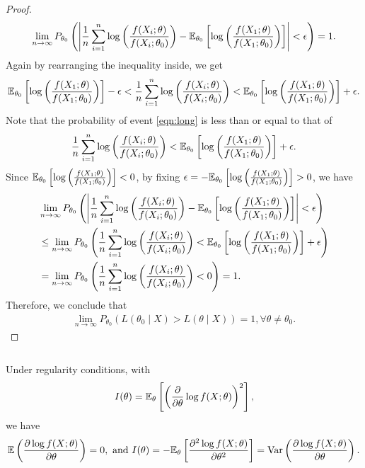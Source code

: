 \begin{proof}
\begin{align*}
\lim_{n\to\infty}P_{\theta_0}\left( \left| \frac{1}{n}\sum_{i=1}^n\log\left( \frac{f(X_i;\theta)}{f(X_i;\theta_0)} \right) - \mathbb{E}_{\theta_0}\left[ \log \left( \frac{f(X_1; \theta)}{f(X_1; \theta_0)} \right) \right] \right| < \epsilon \right) = 1.
\end{align*}
Again by rearranging the inequality inside, we get
\begin{align}
\mathbb{E}_{\theta_0}\left[ \log \left( \frac{f(X_1; \theta)}{f(X_1; \theta_0)} \right) \right] - \epsilon < \frac{1}{n}\sum_{i=1}^n\log\left( \frac{f(X_i;\theta)}{f(X_i;\theta_0)} \right) < \mathbb{E}_{\theta_0}\left[ \log \left( \frac{f(X_1; \theta)}{f(X_1; \theta_0)} \right) \right] + \epsilon. \label{eqn:long}
\end{align}
Note that the probability of event \cref{eqn:long} is less than or equal to that of
\begin{align*}
\frac{1}{n}\sum_{i=1}^n\log\left( \frac{f(X_i;\theta)}{f(X_i;\theta_0)} \right) < \mathbb{E}_{\theta_0}\left[ \log \left( \frac{f(X_1; \theta)}{f(X_1; \theta_0)} \right) \right] + \epsilon.
\end{align*}
Since $\mathbb{E}_{\theta_0}\left[ \log \left( \frac{f(X_1; \theta)}{f(X_1; \theta_0)} \right) \right] < 0$, by fixing $\epsilon = -\mathbb{E}_{\theta_0}\left[ \log \left( \frac{f(X_1; \theta)}{f(X_1; \theta_0)} \right) \right] > 0$, we have
\begin{align*}
&\lim_{n\to\infty}P_{\theta_0}\left( \left| \frac{1}{n}\sum_{i=1}^n\log\left( \frac{f(X_i;\theta)}{f(X_i;\theta_0)} \right) - \mathbb{E}_{\theta_0}\left[ \log \left( \frac{f(X_1; \theta)}{f(X_1; \theta_0)} \right) \right] \right| < \epsilon \right)\\
&\leq \lim_{n\to\infty}P_{\theta_0}\left( \frac{1}{n}\sum_{i=1}^n\log\left( \frac{f(X_i;\theta)}{f(X_i;\theta_0)} \right) < \mathbb{E}_{\theta_0}\left[ \log \left( \frac{f(X_1; \theta)}{f(X_1; \theta_0)} \right) \right] + \epsilon \right)\\
&= \lim_{n\to\infty}P_{\theta_0}\left( \frac{1}{n}\sum_{i=1}^n\log\left( \frac{f(X_i;\theta)}{f(X_i;\theta_0)} \right) < 0 \right) = 1.
\end{align*}
Therefore, we conclude that
\begin{align*}
\lim_{n\to\infty} P_{\theta_0}\left( L(\theta_0 \mid X) > L(\theta \mid X) \right) = 1, \forall \theta \neq \theta_0.
\end{align*}
\end{proof}
$ $\\
\begin{lemma} \label{lem:2}
Under regularity conditions, with
\begin{align}
I(\theta) = \mathbb{E}_{\theta}\left[ \left( \frac{\partial}{\partial\theta}\log f(X;\theta) \right)^2 \right], \label{eqn:fisher}
\end{align}
we have
\begin{align*}
\mathbb{E}\left( \frac{\partial\log f(X;\theta)}{\partial \theta} \right) = 0, \text{ and }
I(\theta) = -\mathbb{E}_\theta\left[ \frac{\partial^2\log f(X;\theta)}{\partial \theta^2} \right] = \text{Var}\left( \frac{\partial\log f(X;\theta)}{\partial \theta} \right).
\end{align*}
\end{lemma}
